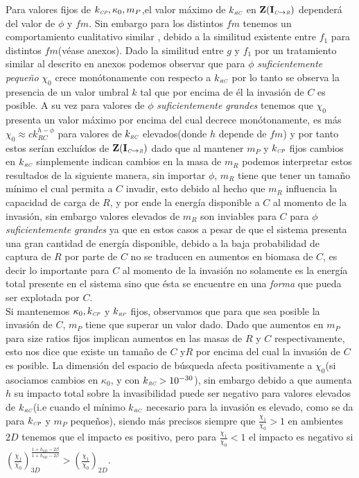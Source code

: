 Para valores fijos de $k_{\textit{\tiny CP}}, \kappa_0 ,m_P$,el valor m\'aximo de $k_{\textit{\tiny RC}}$ en $\mathbf{Z(I_{\textit{\tiny C}\to \textit{\tiny R}})}$ depender\'a del valor de $\phi$ y $fm$. Sin embargo para los distintos $fm$ tenemos un comportamiento cualitativo similar , debido a la similitud existente entre $f_1$ para distintos $fm$(v\'ease anexos). Dado la similitud entre $g$ y $f_1$ por un tratamiento similar al descrito en anexos podemos observar que para $\phi$ \emph{suficientemente peque\~no} $\chi_0$ crece mon\'otonamente con respecto a $k_{\textit{\tiny RC}}$ por lo tanto se observa la presencia de un valor umbral $k$ tal que por encima de \'el la invasi\'on de $C$ es posible. A su vez para valores de $\phi$ \emph{suficientemente grandes} tenemos que $\chi_0$ presenta un valor m\'aximo por encima del cual decrece mon\'otonamente, es m\'as $\chi_0 \approx c k_{RC}^{h - \phi}$ para valores de $k_{\textit{\tiny RC}}$ elevados(donde $h$ depende de $fm$) y por tanto estos ser\'ian exclu\'idos de $\mathbf{Z(I_{\textit{\tiny C}\to \textit{\tiny R}})}$ dado que al mantener $m_P$ y $k_{\textit{\tiny CP}}$ fijos cambios en $k_{\textit{\tiny RC}}$ simplemente indican cambios en la masa de $m_R$ podemos interpretar estos resultados de la siguiente manera, sin importar $\phi$, $m_R$ tiene que tener un tama\~no m\'inimo el cual permita a $C$ invadir, esto debido al hecho que $m_R$ influencia la capacidad de carga de $R$, y por ende la energ\'ia disponible a $C$ al momento de la invasi\'on, sin embargo valores elevados de $m_R$ son inviables para $C$ para $\phi$ \emph{suficientemente grandes} ya que en estos casos a pesar de que el sistema presenta una gran cantidad de energ\'ia disponible, debido a la baja probabilidad de captura de $R$ por parte de $C$ no se traducen en aumentos en biomasa de $C$, es decir lo importante para $C$ al momento de la invasi\'on no solamente es la energ\'ia total presente en el sistema sino que \'esta se encuentre en una \emph{forma} que pueda ser explotada por $C$.\\


Si mantenemos $\kappa_0,k_{\textit{\tiny CP}}$ y $k_{\textit{\tiny RP}}$ fijos, observamos que para que sea posible la invasi\'on de $C$, $m_P$ tiene que superar un valor dado. Dado que aumentos en $m_P$ para size ratios fijos implican aumentos en las masas de $R$ y $C$ respectivamente, esto nos dice que existe un tama\~no de $C$ y$R$ por encima del cual la invasi\'on de $C$ es posible.
La dimensi\'on del espacio de b\'usqueda afecta positivamente a $\chi_0$(si asociamos cambios en $\kappa_0$, y con $k_{\textit{\tiny RC}} > 10^{-30}$), sin embargo debido a que aumenta $h$ su impacto total sobre la invasibilidad puede ser negativo para valores elevados de $k_{\textit{\tiny RC}}$(i.e cuando el m\'inimo $k_{\textit{\tiny RC}}$ necesario para la invasi\'on es elevado, como se da para $k_{\textit{\tiny CP}}$ y $m_P$ peque\~nos), siendo m\'as precisos siempre que $\frac{\chi_1}{\chi_0} >1$ en ambientes $2D$ tenemos que el impacto es positivo, pero para $\frac{\chi_1}{\chi_0} < 1$ el impacto es negativo si $ (\frac{\chi_1}{\chi_0})_{3D}^\frac{1 + h_{2D} - 2 \beta}{1 + h_{3D} - 2 \beta} >  (\frac{\chi_1}{\chi_0})_{2D} $.\\



